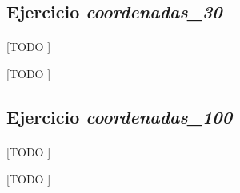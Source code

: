 \documentclass[spanish]{article}
\begin{document}
		\subsection{Ejercicio \emph{coordenadas\_30}}
		\label{sec:e-8b}

			\paragraph{}
			[TODO ]

			\begin{table}[p]
				\begin{center}
				\end{center}
				\caption{[TODO ]}
				\label{}
			\end{table}

		\subsection{Ejercicio \emph{coordenadas\_100}}
		\label{sec:e-8c}

			\paragraph{}
			[TODO ]

			\begin{table}[p]
				\begin{center}
				\end{center}
				\caption{[TODO ]}
				\label{}
			\end{table}

	\nocite{subject:mio}
	\nocite{garciparedes:mosel-examples}
	
  
\end{document}
